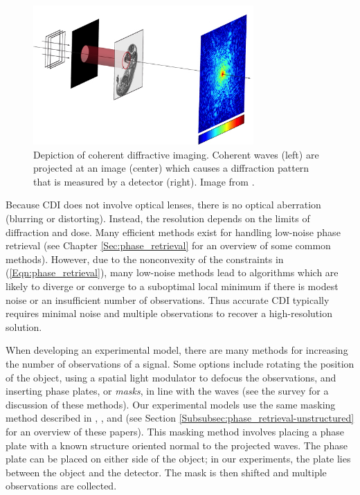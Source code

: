 \begin{figure}
\centering
\includegraphics[width=0.75\textwidth]{phase_retrieval_depiction_mod.jpg}
   \caption{Depiction of coherent diffractive imaging.  Coherent waves (left) are projected at an image (center) which causes a diffraction pattern that is measured by a detector (right). Image from \cite{Guizar-Sicairos}.} 
   \label{Fig:CDI}
\end{figure}

Because CDI does not involve optical lenses, there is no optical aberration (blurring or distorting).  
Instead, the resolution depends on the limits of diffraction and dose.  
Many efficient methods exist for handling low-noise phase retrieval (see Chapter \ref{Sec:phase_retrieval} for an overview of some common methods).  
However, due to the nonconvexity of the constraints in (\ref{Eqn:phase_retrieval}), many low-noise methods lead to algorithms which are likely to diverge or converge to a suboptimal local minimum if there is modest noise or an insufficient number of observations.  
Thus accurate CDI typically requires minimal noise and multiple observations to recover a high-resolution solution.




When developing an experimental model, there are many methods for increasing the number of observations of a signal.  Some options include rotating the position of the object, using a spatial light modulator to defocus the observations, and inserting phase plates, or \textit{masks}, in line with the waves (see the survey \cite{duadi2011digital} for a discussion of these methods).  Our experimental models use the same masking method described in \cite[Section 2]{DBLP:journals/siamis/CandesESV13}, \cite[Sections 4.2, 4.3]{DBLP:journals/tit/CandesLS15}, and \cite[Section 5.1]{DBLP:journals/siamsc/FriedlanderM16} (see Section \ref{Subsubsec:phase_retrieval-unstructured} for an overview of these papers).  
This masking method involves placing a phase plate with a known structure oriented normal to the projected waves.  The phase plate can be placed on either side of the object; in our experiments, the plate lies between the object and the detector.  The mask is then shifted and multiple observations are collected.




